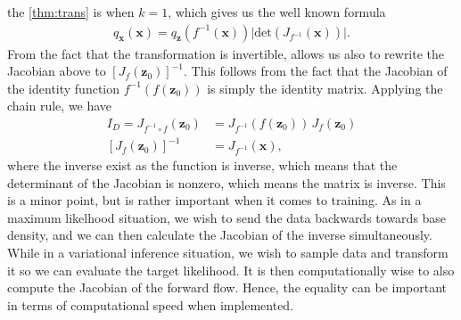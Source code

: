 the \cref{thm:trans} is when \(k=1\), which gives us the well known formula
\begin{align*}
    q_{\bm x}(\bm x) = q_{\bm z}(f^{-1}(\bm x))\lvert \text{det}\left(J_{f^{-1}}(\bm x)\right)\rvert.
\end{align*}
From the fact that the transformation is invertible, allows us also to rewrite the Jacobian above
to \([J_{f}(\bm z_0)]^{-1}\). This follows from the fact that the Jacobian of the identity function \(f^{-1}(f(\bm z_0))\)
is simply the identity matrix. Applying the chain rule, we have
\begin{align*}
    I_D = J_{f^{-1} \circ f}(\bm z_0) &= J_{f^{-1}}(f(\bm z_0)) \, J_{f}(\bm z_0)\\
    [J_{f}(\bm z_0)]^{-1} &= J_{f^{-1}}(\bm x),
\end{align*}
where the inverse exist as the function is inverse, which means that the determinant of the Jacobian is nonzero,
which means the matrix is inverse. This is a minor point, but is rather important when it comes to training. As in a
maximum likelhood situation, we wish to send the data backwards towards base density, and we can then calculate the 
Jacobian of the inverse simultaneously. While in a variational inference situation, we wish to sample data and transform it
so we can evaluate the target likelihood. It is then computationally wise to also compute the Jacobian of the forward flow. 
Hence, the equality can be important in terms of computational speed when implemented.\\

